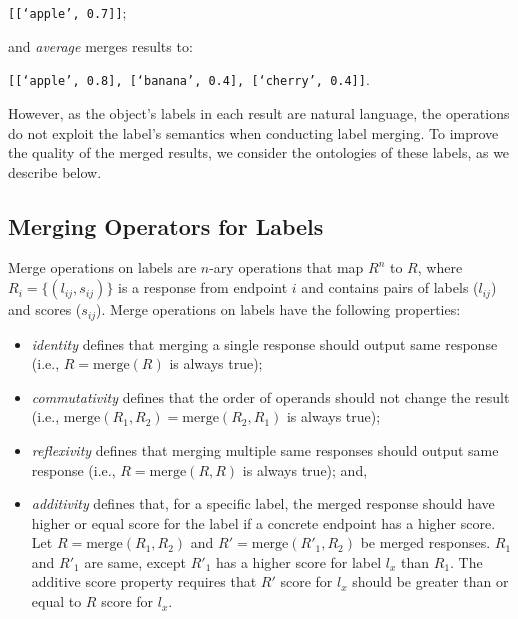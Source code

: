 \begin{center}
\texttt{[[`apple', 0.7]]}; 
\end{center}

\noindent
and \textit{average} merges results to:

\begin{center}
\texttt{[[`apple', 0.8], [`banana', 0.4], [`cherry', 0.4]]}.
\end{center}

\noindent
However, as the object's labels in each result are natural language, the operations do not exploit the label's semantics when conducting label merging. To improve the quality of the merged results, we consider the ontologies of these labels, as we describe below.

\subsection{Merging Operators for Labels}\label{icwe2019:sec:operator-properties}

Merge operations on labels are $n$-ary operations that map $R^{n}$ to $R$, where $R_i=\{(l_{ij}, s_{ij})\}$ is a response from endpoint $i$ and contains pairs of labels ($l_{ij}$) and scores ($s_{ij}$).
Merge operations on labels have the following properties:
 
\begin{itemize}
\item
\textit{identity} defines that merging a single response should output same response (i.e., $R=\mathrm{merge}(R)$ is always true);
\item
\textit{commutativity} defines that the order of operands should not change the result (i.e., $\mathrm{merge}(R_1, R_2) = \mathrm{merge}(R_2, R_1)$ is always true);
\item
\textit{reflexivity} defines that merging multiple same responses should output same response (i.e., $R=\mathrm{merge}(R, R)$ is always true); and,
\item
\textit{additivity} defines that, for a specific label, the merged response should have higher or equal score for the label if a concrete endpoint has a higher score. Let $R=\mathrm{merge}(R_1, R_2)$ and $R'=\mathrm{merge}(R'_1, R_2)$ be merged responses.
$R_1$ and $R'_1$ are same, except $R'_1$ has a higher score for label $l_x$ than $R_1$. The additive score property requires that $R'$ score for $l_x$ should be greater than or equal to $R$ score for $l_x$.
\end{itemize}

